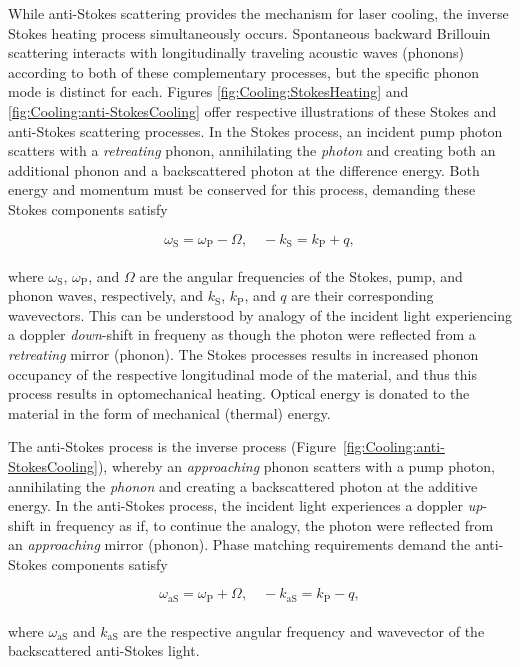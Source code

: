 While anti-Stokes scattering provides the mechanism for laser cooling, the inverse Stokes heating process simultaneously occurs. Spontaneous backward Brillouin scattering interacts with longitudinally traveling acoustic waves (phonons) according to both of these complementary processes, but the specific phonon mode is distinct for each. Figures \ref{fig:Cooling:StokesHeating} and \ref{fig:Cooling:anti-StokesCooling} offer respective illustrations of these Stokes and anti-Stokes scattering processes. In the Stokes process, an incident pump photon scatters with a \emph{retreating} phonon, annihilating the \emph{photon} and creating both an additional phonon and a backscattered photon at the difference energy. Both energy and momentum must be conserved for this process, demanding these Stokes components satisfy

\begin{equation}
\omega_{\mathrm{S}} = \omega_{\mathrm{P}} - \Omega,
\quad
-k_{\mathrm{S}} = k_{\mathrm{P}} + q,
\end{equation}
\\
where \(\omega_{\mathrm{S}}\), \(\omega_{\mathrm{P}}\), and \(\Omega\) are the angular frequencies of the Stokes, pump, and phonon waves, respectively, and \(k_{\mathrm{S}}\), \(k_{\mathrm{P}}\), and \(q\) are their corresponding wavevectors. This can be understood by analogy of the incident light experiencing a doppler \textit{down}-shift in frequeny as though the photon were reflected from a \emph{retreating} mirror (phonon). The Stokes processes results in increased phonon occupancy of the respective longitudinal mode of the material, and thus this process results in optomechanical heating. Optical energy is donated to the material in the form of mechanical (thermal) energy.

The anti-Stokes process is the inverse process (Figure~\ref{fig:Cooling:anti-StokesCooling}), whereby an \textit{approaching} phonon scatters with a pump photon, annihilating the \textit{phonon} and creating a backscattered photon at the additive energy. In the anti-Stokes process, the incident light experiences a doppler \textit{up}-shift in frequency as if, to continue the analogy, the photon were reflected from an \emph{approaching} mirror (phonon). Phase matching requirements demand the anti-Stokes components satisfy

\begin{equation}
  \omega_{\mathrm{aS}} = \omega_{\mathrm{P}} + \Omega,
  \quad
  -k_{\mathrm{aS}} = k_{\mathrm{P}} - q,
  \label{eq:Cooling:anti-Stokes Phase Matching}
\end{equation}
\\
where \(\omega_{\mathrm{aS}}\) and \(k_{\mathrm{aS}}\) are the respective angular frequency and wavevector of the backscattered anti-Stokes light.

